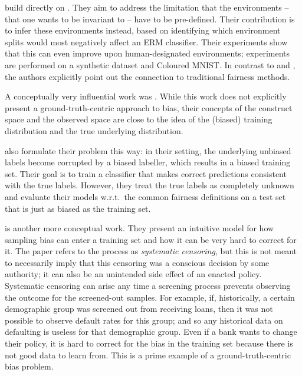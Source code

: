 \citet{creager2020environment} build directly on \citet{arjovsky2019invariant}.
They aim to address the limitation that the environments -- that one wants to be invariant to -- have to be pre-defined.
Their contribution is to infer these environments instead,
based on identifying which environment splits would most negatively affect an \ac{ERM} classifier.
Their experiments show that this can even improve upon human-designated environments;
experiments are performed on a synthetic dataset and Coloured MNIST.
In contrast to \citet{kim2019learning} and \citet{arjovsky2019invariant},
the authors explicitly point out the connection to traditional fairness methods.

A conceptually very influential work was \citet{friedler2016possibility}.
While this work does not explicitly present a ground-truth-centric approach to bias,
their concepts of the construct space and the observed space are close
to the idea of the (biased) training distribution and the true underlying distribution.

\citet{jiang2020identifying} also formulate their problem this way:
in their setting, the underlying unbiased labels become corrupted by a biased labeller,
which results in a biased training set.
Their goal is to train a classifier that makes correct predictions consistent with the true labels.
However, they treat the true labels as completely unknown
and evaluate their models w.r.t.\ the common fairness definitions on a test set
that is just as biased as the training set.

\citet{kallus2018residual} is another more conceptual work.
They present an intuitive model for how sampling bias can enter a training set
and how it can be very hard to correct for it.
The paper refers to the process as \emph{systematic censoring},
but this is not meant to necessarily imply that this censoring was a conscious decision by some authority;
it can also be an unintended side effect of an enacted policy.
Systematic censoring can arise any time a screening process prevents observing the outcome for the screened-out samples.
For example, if, historically, a certain demographic group was screened out from receiving loans,
then it was not possible to observe default rates for this group;
and so any historical data on defaulting is useless for that demographic group.
Even if a bank wants to change their policy,
it is hard to correct for the bias in the training set because there is not good data to learn from.
This is a prime example of a ground-truth-centric bias problem.

